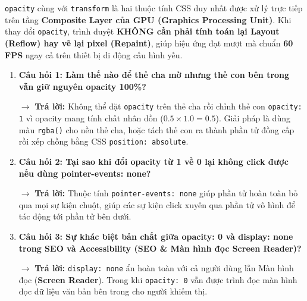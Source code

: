 \documentclass[11pt,oneside]{book}
\newcommand{\codeinline}[1]{\textcolor{accentOrange}{\texttt{#1}}}
\newcommand{\term}[1]{\textbf{\textcolor{primaryBlue}{#1}}}
\begin{document}
\begin{tipBox}
\codeinline{opacity} cùng với \codeinline{transform} là hai thuộc tính CSS duy nhất được xử lý trực tiếp trên tầng \textbf{Composite Layer của GPU (Graphics Processing Unit)}. Khi thay đổi \codeinline{opacity}, trình duyệt \textbf{KHÔNG cần phải tính toán lại Layout (Reflow) hay vẽ lại pixel (Repaint)}, giúp hiệu ứng đạt mượt mà chuẩn \textbf{60 FPS} ngay cả trên thiết bị di động cấu hình yếu.
\end{tipBox}

\begin{warnBox}
\begin{enumerate}[leftmargin=1.5em, itemsep=5pt, parsep=0pt]
    \item \textbf{Câu hỏi 1: Làm thế nào để thẻ cha mờ nhưng thẻ con bên trong vẫn giữ nguyên opacity 100\%?} \par
    $\rightarrow$ \textbf{Trả lời:} Không thể đặt \codeinline{opacity} trên thẻ cha rồi chỉnh thẻ con \codeinline{opacity: 1} vì opacity mang tính chất nhân dồn ($0.5 \times 1.0 = 0.5$). Giải pháp là dùng màu \codeinline{rgba()} cho nền thẻ cha, hoặc tách thẻ con ra thành phần tử đồng cấp rồi xếp chồng bằng CSS \codeinline{position: absolute}.

    \item \textbf{Câu hỏi 2: Tại sao khi đổi opacity từ 1 về 0 lại không click được nếu dùng pointer-events: none?} \par
    $\rightarrow$ \textbf{Trả lời:} Thuộc tính \codeinline{pointer-events: none} giúp phần tử hoàn toàn bỏ qua mọi sự kiện chuột, giúp các sự kiện click xuyên qua phần tử vô hình để tác động tới phần tử bên dưới.

    \item \textbf{Câu hỏi 3: Sự khác biệt bản chất giữa opacity: 0 và display: none trong SEO và Accessibility (SEO \& Màn hình đọc Screen Reader)?} \par
    $\rightarrow$ \textbf{Trả lời:} \codeinline{display: none} ẩn hoàn toàn với cả người dùng lẫn Màn hình đọc (\term{Screen Reader}). Trong khi \codeinline{opacity: 0} vẫn được trình đọc màn hình đọc dữ liệu văn bản bên trong cho người khiếm thị.
\end{enumerate}
\end{warnBox}


\end{document}
